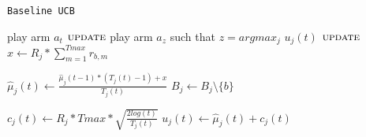 \begin{algorithm}[!h]
	\caption{\texttt{Baseline UCB}}
	\begin{scriptsize}
		\begin{algorithmic}[1]
			
			
			\Statex
			 
				\State play arm $a_t$\;
				\State $\textsc{update}$
			\EndFor
			 
				\State play arm $a_z$ such that  $z = argmax_j$ $u_j (t)$\;
				\State $\textsc{update}$
			\EndFor
			\EndFunction
			\Statex
						\State$x \gets   R_j * \sum_{m=1}^{Tmax}r_{b,m} $\;
						
						\State$\hat{\mu}_j(t) \gets \frac{\hat{\mu}_j(t-1)*(T_j(t)-1)+x}{T_j(t)}$\;
						\State$B_j \gets B_j \setminus \{b\}$\;	
										
					\EndIf				
				\EndFor			
				
			\State$c_j(t)\gets R_j * Tmax * \sqrt{\frac{2log(t)}{T_j(t)}}$\;
			\State$u_j(t) \gets  \hat{\mu}_j(t) +  c_j(t)$
			\EndFor
			
			
			
			
			\EndFunction
			
		\end{algorithmic}
	\end{scriptsize}
	\label{alg:BaselineUCB}
\end{algorithm}


